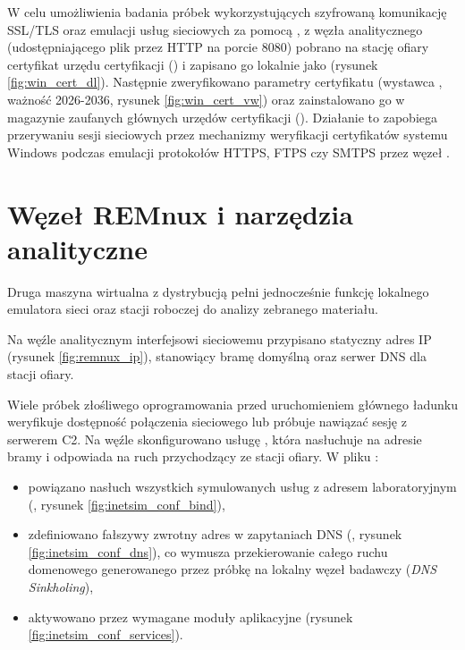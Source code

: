 W celu umożliwienia badania próbek wykorzystujących szyfrowaną komunikację SSL/TLS oraz emulacji usług sieciowych za pomocą , z węzła analitycznego (udostępniającego plik przez HTTP na porcie 8080) pobrano na stację ofiary certyfikat urzędu certyfikacji () i zapisano go lokalnie jako  (rysunek \ref{fig:win_cert_dl}). Następnie zweryfikowano parametry certyfikatu (wystawca , ważność 2026-2036, rysunek \ref{fig:win_cert_vw}) oraz zainstalowano go w magazynie zaufanych głównych urzędów certyfikacji (). Działanie to zapobiega przerywaniu sesji sieciowych przez mechanizmy weryfikacji certyfikatów systemu Windows podczas emulacji protokołów HTTPS, FTPS czy SMTPS przez węzeł .



\section{Węzeł REMnux i narzędzia analityczne}\label{sec:konfiguracja_remnux}

Druga maszyna wirtualna z dystrybucją  pełni jednocześnie funkcję lokalnego emulatora sieci oraz stacji roboczej do analizy zebranego materiału.

Na węźle analitycznym interfejsowi sieciowemu  przypisano statyczny adres IP  (rysunek \ref{fig:remnux_ip}), stanowiący bramę domyślną oraz serwer DNS dla stacji ofiary.


Wiele próbek złośliwego oprogramowania przed uruchomieniem głównego ładunku weryfikuje dostępność połączenia sieciowego lub próbuje nawiązać sesję z serwerem C2. Na węźle skonfigurowano usługę , która nasłuchuje na adresie bramy i odpowiada na ruch przychodzący ze stacji ofiary. W pliku :
\begin{itemize}
    \item powiązano nasłuch wszystkich symulowanych usług z adresem laboratoryjnym (, rysunek \ref{fig:inetsim_conf_bind}),
    \item zdefiniowano fałszywy zwrotny adres w zapytaniach DNS (, rysunek \ref{fig:inetsim_conf_dns}), co wymusza przekierowanie całego ruchu domenowego generowanego przez próbkę na lokalny węzeł badawczy (\textit{DNS Sinkholing}),
    \item aktywowano przez  wymagane moduły aplikacyjne (rysunek \ref{fig:inetsim_conf_services}).
\end{itemize}

